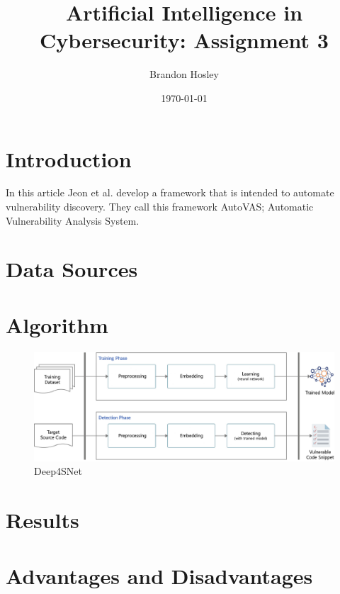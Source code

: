 \documentclass[]{article}
\title{Artificial Intelligence in Cybersecurity: Assignment 3}
\author{Brandon Hosley}
\date{\today}
\begin{document}
	\maketitle
	
\section{Introduction}

In this article \cite{Jeon2021} Jeon et al. develop a framework that is intended to automate vulnerability discovery.
They call this framework AutoVAS; Automatic Vulnerability Analysis System.


\section{Data Sources}



\section{Algorithm}



\begin{figure}[h]
	\centering
	\includegraphics[width=\textwidth]{Algorithm}
	\caption{Deep4SNet \cite{Jeon2021}}
\end{figure}


\section{Results}



\section{Advantages and Disadvantages}
\end{document}
